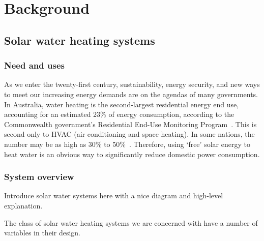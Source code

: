 \chapter{Background}
\label{ch:background}

\section{Solar water heating systems}

\subsection{Need and uses}

As we enter the twenty-first century, sustainability, energy security, and new ways to meet our increasing energy demands are on the agendas of many governments.
In Australia, water heating is the second-largest residential energy end use, accounting for an estimated 23\% of energy consumption, according to the Commonwealth government's Residential End-Use Monitoring Program~\cite{REMP12}.
This is second only to HVAC (air conditioning and space heating).
In some nations, the number may be as high as 30\% to 50\%~\cite{Lane96}.
Therefore, using `free' solar energy to heat water is an obvious way to significantly reduce domestic power consumption.

\subsection{System overview}
\label{sec:background:system}

Introduce solar water systems here with a nice diagram and high-level explanation.

The class of solar water heating systems we are concerned with have a number of variables in their design.

